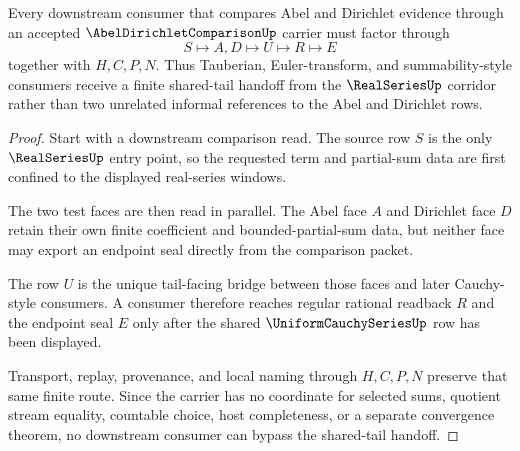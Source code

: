 \begin{theorem}
\label{thm:abel-dirichlet-comparison-shared-tail-route}
Every downstream consumer that compares Abel and Dirichlet evidence through an accepted $\AbelDirichletComparisonUp$ carrier must factor through
$$
S\longmapsto A,D\longmapsto U\longmapsto R\longmapsto E
$$
together with $H,C,P,N$. Thus Tauberian, Euler-transform, and summability-style consumers receive a finite shared-tail handoff from the $\RealSeriesUp$ corridor rather than two unrelated informal references to the Abel and Dirichlet rows.
\end{theorem}
\begin{proof}
Start with a downstream comparison read. The source row $S$ is the only $\RealSeriesUp$ entry point, so the requested term and partial-sum data are first confined to the displayed real-series windows.

The two test faces are then read in parallel. The Abel face $A$ and Dirichlet face $D$ retain their own finite coefficient and bounded-partial-sum data, but neither face may export an endpoint seal directly from the comparison packet.

The row $U$ is the unique tail-facing bridge between those faces and later Cauchy-style consumers. A consumer therefore reaches regular rational readback $R$ and the endpoint seal $E$ only after the shared $\UniformCauchySeriesUp$ row has been displayed.

Transport, replay, provenance, and local naming through $H,C,P,N$ preserve that same finite route. Since the carrier has no coordinate for selected sums, quotient stream equality, countable choice, host completeness, or a separate convergence theorem, no downstream consumer can bypass the shared-tail handoff.
\end{proof}




